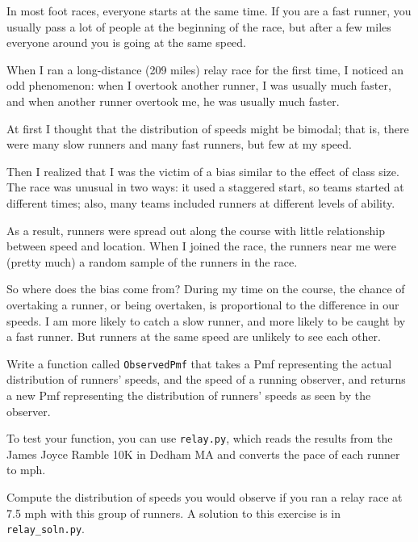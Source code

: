 \documentclass[12pt]{book}
\begin{document}
\begin{exercise}
\label{relay}

In most foot races, everyone starts at the same time.  If you are a
fast runner, you usually pass a lot of people at the beginning of the
race, but after a few miles everyone around you is going at the same
speed.

When I ran a long-distance (209 miles) relay race for the first
time, I noticed an odd phenomenon: when I overtook another runner, I
was usually much faster, and when another runner overtook me, he was
usually much faster.

At first I thought that the distribution of speeds might be bimodal;
that is, there were many slow runners and many fast runners, but few
at my speed.

Then I realized that I was the victim of a bias similar to the
effect of class size.  The race
was unusual in two ways: it used a staggered start, so teams started
at different times; also, many teams included runners at different
levels of ability.  

As a result, runners were spread out along the course with little
relationship between speed and location.  When I joined the race, the
runners near me were (pretty much) a random sample of the runners in
the race.

So where does the bias come from?  During my time on the course, the
chance of overtaking a runner, or being overtaken, is proportional to
the difference in our speeds.  I am more likely to catch a slow
runner, and more likely to be caught by a fast runner.  But runners
at the same speed are unlikely to see each other.

Write a function called \verb"ObservedPmf" that takes a Pmf representing
the actual distribution of runners' speeds, and the speed of a running
observer, and returns a new Pmf representing the distribution of
runners' speeds as seen by the observer.

To test your function, you can use \verb"relay.py", which  reads the
results from the James Joyce Ramble 10K in Dedham MA and converts the
pace of each runner to mph.

Compute the distribution of speeds you would observe if you ran a
relay race at 7.5 mph with this group of runners.  A solution to this
exercise is in \verb"relay_soln.py".
\end{exercise}
\end{document}
